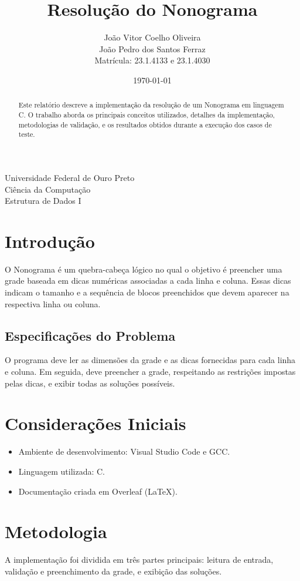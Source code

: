 \documentclass[a4paper,12pt]{article}
\title{Resolução do Nonograma}
\author{Jo\~ao Vitor Coelho Oliveira \\ João Pedro dos Santos Ferraz \\
Matr\'icula: 23.1.4133 e 23.1.4030}
\date{\today}
\begin{document}
\maketitle

\begin{center}
    Universidade Federal de Ouro Preto\\
    Ci\^encia da Computa\c{c}\~ao\\
    Estrutura de Dados I
\end{center}

\begin{abstract}
    Este relat\'orio descreve a implementa\c{c}\~ao da resolu\c{c}\~ao de um Nonograma em linguagem C. O trabalho aborda os principais conceitos utilizados, detalhes da implementa\c{c}\~ao, metodologias de valida\c{c}\~ao, e os resultados obtidos durante a execu\c{c}\~ao dos casos de teste.
\end{abstract}

\section{Introdu\c{c}\~ao}
O Nonograma \'{e} um quebra-cabe\c{c}a l\'ogico no qual o objetivo \'{e} preencher uma grade baseada em dicas num\'ericas associadas a cada linha e coluna. Essas dicas indicam o tamanho e a sequ\^encia de blocos preenchidos que devem aparecer na respectiva linha ou coluna. 

\subsection{Especifica\c{c}\~oes do Problema}
O programa deve ler as dimens\~oes da grade e as dicas fornecidas para cada linha e coluna. Em seguida, deve preencher a grade, respeitando as restri\c{c}\~oes impostas pelas dicas, e exibir todas as solu\c{c}\~oes poss\'iveis.

\section{Considera\c{c}\~oes Iniciais}
\begin{itemize}
    \item Ambiente de desenvolvimento: Visual Studio Code e GCC.
    \item Linguagem utilizada: C.
    \item Documenta\c{c}\~ao criada em Overleaf (LaTeX).
\end{itemize}

\section{Metodologia}
A implementa\c{c}\~ao foi dividida em tr\^es partes principais: leitura de entrada, valida\c{c}\~ao e preenchimento da grade, e exibi\c{c}\~ao das solu\c{c}\~oes.
\end{document}
